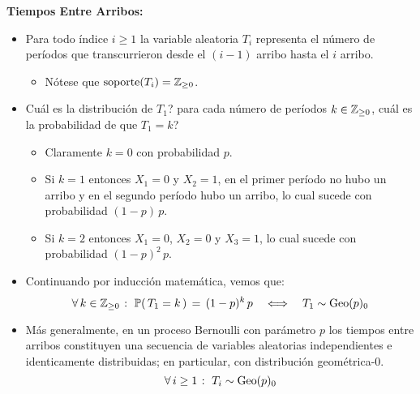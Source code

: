 \documentclass[ 10pt, xcolor = dvipsnames]{beamer}
\begin{document}
\begin{frame}[allowframebreaks]
\frametitle{\insertsection}

\textbf{Tiempos Entre Arribos:}
\begin{itemize}
\item Para todo \'indice $i \geq 1$ la variable aleatoria $T_i$ representa el n\'umero de per\'iodos que transcurrieron desde el $(i-1)$ arribo hasta el $i$ arribo. 
\begin{itemize}
\item N\'otese que $\text{soporte}(T_i) = {\mathbb{Z}}_{\geq 0}$. 
\end{itemize}
\item Cu\'al es la distribuci\'on de $T_1$? \Ie para cada n\'umero de per\'iodos $k \in {\mathbb{Z}}_{\geq 0}$, cu\'al es la probabilidad de que $T_1 = k$? 
\begin{itemize}
\item Claramente $k = 0$ con probabilidad $p$. 
\item Si $k = 1$ entonces $X_1 = 0$ y $X_2 = 1$, \ie en el primer per\'iodo no hubo un arribo y en el segundo per\'iodo hubo un arribo, lo cual sucede con \linebreak probabilidad $(1-p) \, p$. 
\item Si $k = 2$ entonces $X_1 = 0$, $X_2 = 0$ y $X_3 = 1$, lo cual sucede con \linebreak probabilidad $(1-p)^2 \, p$. 
\end{itemize}
\framebreak
\item Continuando por inducci\'on matem\'atica, vemos que: 
\[
\forall \, k \in {\mathbb{Z}}_{\geq 0} \; \colon \; 
\mathbb{P}( \, T_1 = k \, ) \, = \, (1-p)^k \, p 
\quad \Longleftrightarrow \quad T_1 \sim \text{Geo}(p)_0
\]
\item M\'as generalmente, en un proceso Bernoulli con par\'ametro $p$ los tiempos entre arribos constituyen una secuencia de variables aleatorias independientes e identicamente distribuidas; en particular, con distribuci\'on geom\'etrica-0. \Iec
\[
\forall \, i \geq 1 \; \colon \; T_i \sim \text{Geo}(p)_0
\]
\end{itemize}

\end{frame}
\end{document}
